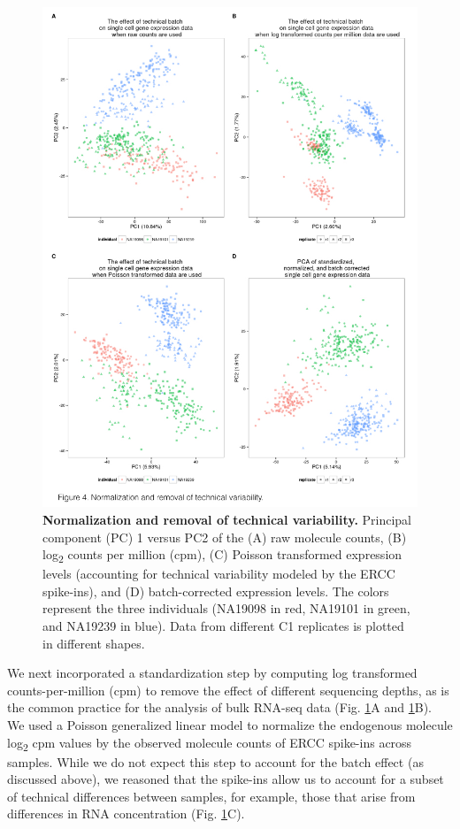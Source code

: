 \begin{figure}
\centering \includegraphics[trim=0 .5in 0
  0,clip,width=5in]{img/ch04/Figure04.jpeg}
\caption[Normalization and removal of technical
  variability.]{\textbf{Normalization and removal of technical
    variability.} Principal component (PC) 1 versus PC2 of the (A) raw
  molecule counts, (B) log\textsubscript{2} counts per million (cpm),
  (C) Poisson transformed expression levels (accounting for technical
  variability modeled by the ERCC spike-ins), and (D) batch-corrected
  expression levels. The colors represent the three individuals
  (NA19098 in red, NA19101 in green, and NA19239 in blue). Data from
  different C1 replicates is plotted in different shapes.}
\label{fig:normalization}
\end{figure}

We next incorporated a standardization step by computing log
transformed counts-per-million (cpm) to remove the effect of different
sequencing depths, as is the common practice for the analysis of bulk
RNA-seq data (Fig. \ref{fig:normalization}A and
\ref{fig:normalization}B). We used a Poisson generalized linear model
to normalize the endogenous molecule log\textsubscript{2} cpm values
by the observed molecule counts of ERCC spike-ins across
samples. While we do not expect this step to account for the batch
effect (as discussed above), we reasoned that the spike-ins allow us
to account for a subset of technical differences between samples, for
example, those that arise from differences in RNA concentration
(Fig. \ref{fig:normalization}C).

